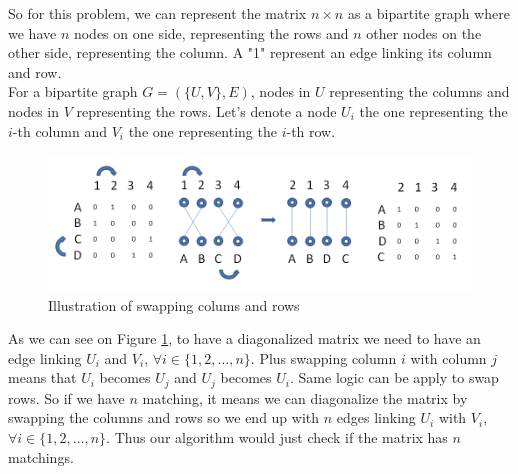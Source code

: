 So for this problem, we can represent the matrix $n\times n$ as a bipartite graph where we have $n$ nodes on one side, representing the rows and $n$ other nodes on the other side, representing the column. A "1" represent an edge linking its column and row.\\
For a bipartite graph $G = (\{U, V\}, E)$, nodes in $U$ representing the columns and nodes in $V$ representing the rows. Let's denote a node $U_i$ the one representing the $i$-th column and $V_i$ the one representing the $i$-th row.\\
\begin{figure}[here]
\includegraphics[scale=0.5]{matrix-matching}
\caption{Illustration of swapping colums and rows}
\label{fig:matrix-matching}
\end{figure}
As we can see on Figure \ref{fig:matrix-matching}, to have a diagonalized matrix we need to have an edge linking $U_i$ and $V_i$, $\forall i \in \{1,2,\dots,n\}$. Plus swapping column $i$ with column $j$ means that $U_i$ becomes $U_j$ and $U_j$ becomes $U_i$. Same logic can be apply to swap rows. So if we have $n$ matching, it means we can diagonalize the matrix by swapping the columns and rows so we end up with $n$ edges linking $U_i$ with $V_i$, $\forall i \in \{1,2,\dots,n\}$. Thus our algorithm would just check if the matrix has $n$ matchings.
